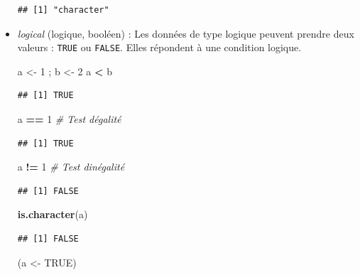 \documentclass[
  11pt,
]{book}
\newenvironment{Shaded}{\begin{snugshade}}{\end{snugshade}}
\newcommand{\CommentTok}[1]{\textcolor[rgb]{0.56,0.35,0.01}{\textit{#1}}}
\newcommand{\DecValTok}[1]{\textcolor[rgb]{0.00,0.00,0.81}{#1}}
\newcommand{\KeywordTok}[1]{\textcolor[rgb]{0.13,0.29,0.53}{\textbf{#1}}}
\newcommand{\NormalTok}[1]{#1}
\newcommand{\OperatorTok}[1]{\textcolor[rgb]{0.81,0.36,0.00}{\textbf{#1}}}
\newcommand{\OtherTok}[1]{\textcolor[rgb]{0.56,0.35,0.01}{#1}}
\newcommand{\StringTok}[1]{\textcolor[rgb]{0.31,0.60,0.02}{#1}}
\numberwithin{equation}{section}
\numberwithin{countremarque}{section}
\begin{document}
\begin{itemize}
\begin{lstlisting}
## [1] "character"
\end{lstlisting}
\item
  \emph{logical} (logique, booléen) :
  Les données de type logique peuvent prendre deux valeurs : \texttt{TRUE} ou \texttt{FALSE}. Elles répondent à une condition logique.

\begin{Shaded}
\begin{Highlighting}[]
\NormalTok{a \textless{}{-}}\StringTok{ }\DecValTok{1}\NormalTok{ ; b \textless{}{-}}\StringTok{ }\DecValTok{2}
\NormalTok{a }\OperatorTok{\textless{}}\StringTok{ }\NormalTok{b}
\end{Highlighting}
\end{Shaded}

\begin{lstlisting}
## [1] TRUE
\end{lstlisting}

\begin{Shaded}
\begin{Highlighting}[]
\NormalTok{a }\OperatorTok{==}\StringTok{ }\DecValTok{1} \CommentTok{\# Test d\textquotesingle{}égalité}
\end{Highlighting}
\end{Shaded}

\begin{lstlisting}
## [1] TRUE
\end{lstlisting}

\begin{Shaded}
\begin{Highlighting}[]
\NormalTok{a }\OperatorTok{!=}\StringTok{ }\DecValTok{1} \CommentTok{\# Test d\textquotesingle{}inégalité}
\end{Highlighting}
\end{Shaded}

\begin{lstlisting}
## [1] FALSE
\end{lstlisting}

\begin{Shaded}
\begin{Highlighting}[]
\KeywordTok{is.character}\NormalTok{(a)}
\end{Highlighting}
\end{Shaded}

\begin{lstlisting}
## [1] FALSE
\end{lstlisting}

\begin{Shaded}
\begin{Highlighting}[]
\NormalTok{(a \textless{}{-}}\StringTok{ }\OtherTok{TRUE}\NormalTok{)}
\end{Highlighting}
\end{Shaded}


\end{itemize}
\end{document}
